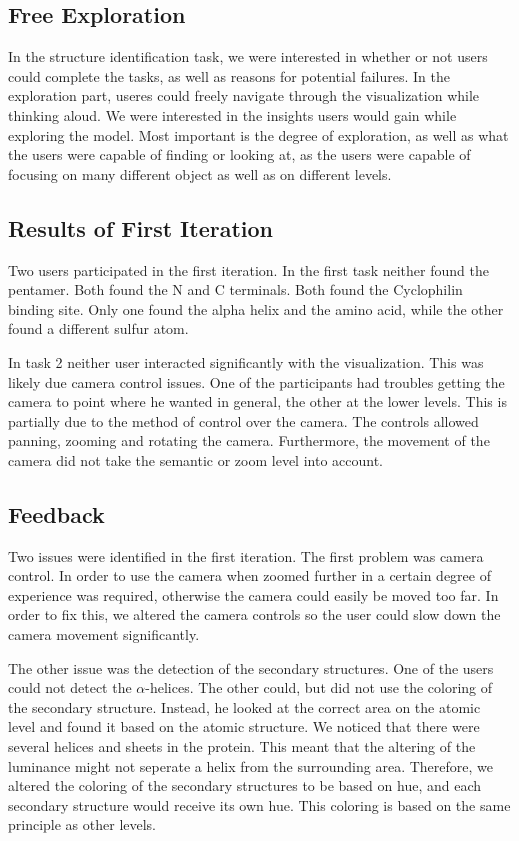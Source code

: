 \documentclass[review,journal]{vgtc}         %
\begin{document}
\subsection{Free Exploration}
In the structure identification task, we were interested in whether or not users could complete the tasks, as well as reasons for potential failures. 
In the exploration part, useres could freely navigate through the visualization while thinking aloud. We were interested in the insights users would gain while exploring the model.
Most important is the degree of exploration, as well as what the users were capable of finding or looking at, as the users were capable of focusing on many different object as well as on different levels.


\subsection{Results of First Iteration}
Two users participated in the first iteration. 
In the first task neither found the pentamer. 
Both found the N and C terminals. 
Both found the Cyclophilin binding site. 
Only one found the alpha helix and the amino acid, while the other found a different sulfur atom.

In task 2 neither user interacted significantly with the visualization. This was likely due camera control issues. 
One of the participants had troubles getting the camera to point where he wanted in general, the other at the lower levels.
This is partially due to the method of control over the camera. 
The controls allowed panning, zooming and rotating the camera. 
Furthermore, the movement of the camera did not take the semantic or zoom level into account.

\subsection{Feedback}
Two issues were identified in the first iteration. 
The first problem was camera control. 
In order to use the camera when zoomed further in a certain degree of experience was required, otherwise the camera could easily be moved too far.
In order to fix this, we altered the camera controls so the user could slow down the camera movement significantly.

The other issue was the detection of the secondary structures. 
One of the users could not detect the $\alpha$-helices. The other could, but did not use the coloring of the secondary structure.
Instead, he looked at the correct area on the atomic level and found it based on the atomic structure.
We noticed that there were several helices and sheets in the protein. 
This meant that the altering of the luminance might not seperate a helix from the surrounding area. 
Therefore, we altered the coloring of the secondary structures to be based on hue, and each secondary structure would receive its own hue.
This coloring is based on the same principle as other levels.
\end{document}
